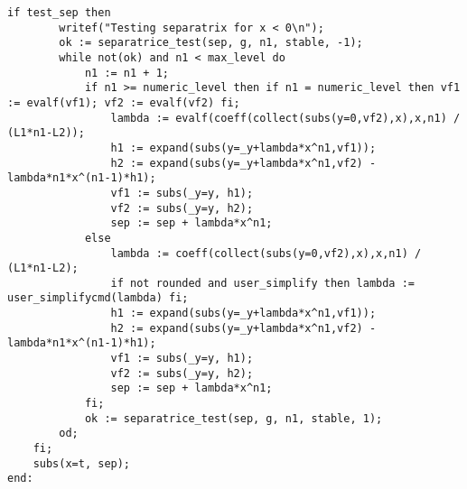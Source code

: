 \documentclass[a4paper,10pt]{article}
\begin{document}
\begin{lstlisting}[name=type]
    if test_sep then
        writef("Testing separatrix for x < 0\n");
        ok := separatrice_test(sep, g, n1, stable, -1);
        while not(ok) and n1 < max_level do
            n1 := n1 + 1;
            if n1 >= numeric_level then if n1 = numeric_level then vf1 := evalf(vf1); vf2 := evalf(vf2) fi;
                lambda := evalf(coeff(collect(subs(y=0,vf2),x),x,n1) / (L1*n1-L2));
                h1 := expand(subs(y=_y+lambda*x^n1,vf1));
                h2 := expand(subs(y=_y+lambda*x^n1,vf2) - lambda*n1*x^(n1-1)*h1);
                vf1 := subs(_y=y, h1);
                vf2 := subs(_y=y, h2);
                sep := sep + lambda*x^n1;
            else
                lambda := coeff(collect(subs(y=0,vf2),x),x,n1) / (L1*n1-L2);
                if not rounded and user_simplify then lambda := user_simplifycmd(lambda) fi;
                h1 := expand(subs(y=_y+lambda*x^n1,vf1));
                h2 := expand(subs(y=_y+lambda*x^n1,vf2) - lambda*n1*x^(n1-1)*h1);
                vf1 := subs(_y=y, h1);
                vf2 := subs(_y=y, h2);
                sep := sep + lambda*x^n1;
            fi;
            ok := separatrice_test(sep, g, n1, stable, 1);
        od;
    fi;
    subs(x=t, sep);
end:
\end{lstlisting}
\end{document}
